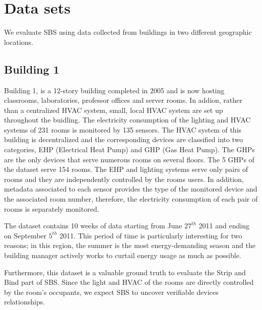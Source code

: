 \section{Data sets}
We evaluate SBS using data collected from buildings in two different geographic locations.  

\subsection{Building 1} \label{data:engbldg2}
Building 1, is a 12-story building completed in 2005 and is now hosting classrooms, laboratories, professor offices 
and server rooms.  In addion, rather than a centralized HVAC system, small, local HVAC system are set up throughout
the buidling.  The electricity consumption of the lighting and HVAC systems of 231 rooms is monitored by 135 sensors.
The HVAC system of this building is decentralized and the corresponding devices are classified into two categories, EHP (Electrical Heat Pump) 
and GHP (Gas Heat Pump).
The GHPs are the only devices that serve numerous rooms on several floors.  The 5 GHPs of the dataset serve 154 rooms.
The EHP and lighting systems serve only pairs of rooms and they are independently controlled by the rooms users.
In addition, metadata associated to each sensor provides the type of the monitored device and the associated room number, 
therefore, the electricity consumption of each pair of rooms is separately monitored.

The dataset contains 10 weeks of data starting from June $27^{th}$ 2011 and ending on September $5^{th}$ 2011.
This period of time is particularly interesting for two reasons; in this region, the summer is the most energy-demanding 
season and the building manager actively works to curtail energy usage as much as possible.

Furthermore, this dataset is a valuable ground truth to evaluate the Strip and Bind part of SBS.
Since the light and HVAC of the rooms are directly controlled by the room's occupants, we expect SBS to uncover verifiable devices 
relationships.  

